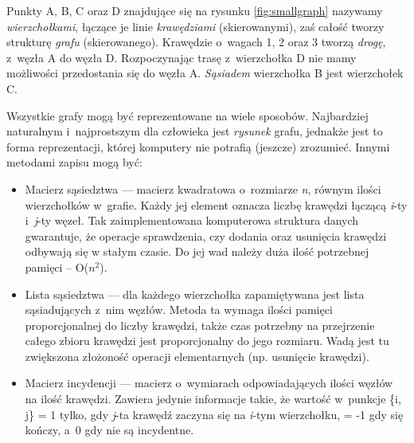 \documentclass[a4paper,12pt,polish,twoside,openright]{thesis}
\begin{document}
Punkty A, B, C oraz D znajdujące się na rysunku \ref{fig:smallgraph} nazywamy \emph{wierzchołkami}, łączące je linie \emph{krawędziami} (skierowanymi), zaś całość tworzy strukturę \emph{grafu} (skierowanego).
Krawędzie o~wagach 1, 2 oraz 3 tworzą \emph{drogę}, z~węzła A do węzła D. Rozpoczynając trasę z~wierzchołka D nie mamy możliwości przedostania się do węzła A.
\emph{Sąsiadem} wierzchołka B jest wierzchołek C.

Wszystkie grafy mogą być reprezentowane na wiele sposobów.
Najbardziej naturalnym i~najprostszym dla człowieka jest \emph{rysunek} grafu, jednakże jest to forma reprezentacji, której komputery nie potrafią (jeszcze) zrozumieć.
Innymi metodami zapisu mogą być:
\begin{itemize}
	\item Macierz sąsiedztwa --- macierz kwadratowa o~rozmiarze \emph{n}, równym ilości wierzchołków w~grafie.
	Każdy jej element oznacza liczbę krawędzi łączącą \emph{i}-ty i~\emph{j}-ty węzeł.
	Tak zaimplementowana komputerowa struktura danych gwarantuje, że operacje sprawdzenia, czy dodania oraz usunięcia krawędzi odbywają się w stałym czasie.
	Do jej wad należy duża ilość potrzebnej pamięci – O($n^2$).

	\label{neigh_list}
	\item Lista sąsiedztwa --- dla każdego wierzchołka zapamiętywana jest lista sąsiadujących z~nim węzłów.
	Metoda ta wymaga ilości pamięci proporcjonalnej do liczby krawędzi, także czas potrzebny na przejrzenie całego zbioru krawędzi jest proporcjonalny do jego rozmiaru.
	Wadą jest tu zwiększona złożoność operacji elementarnych (np. usunięcie krawędzi).

	\item Macierz incydencji --- macierz o~wymiarach odpowiadających ilości węzłów na ilość krawędzi.
	Zawiera jedynie informacje takie, że wartość w~punkcje \{i, j\} = 1 tylko, gdy \emph{j}-ta krawędź zaczyna się na \emph{i}-tym wierzchołku, = -1 gdy się kończy, a~0 gdy nie są incydentne.
\end{itemize}
\end{document}
